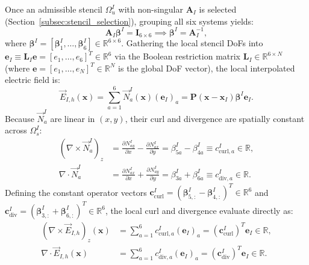 \documentclass[VANCOUVER,Times1COL]{WileyNJD-v5}
\begin{document}
Once an admissible stencil $\Omega_u^I$ with non-singular $\mathbf{A}_I$ is selected (Section~\ref{subsec:stencil_selection}), grouping all six systems yields:
\begin{equation}
    \mathbf{A}_I \boldsymbol{\beta}^I = \mathbf{I}_{6 \times 6} \implies \boldsymbol{\beta}^I = \mathbf{A}_I^{-1},
    \label{eq:beta_matrix_inversion}
\end{equation}
where $\boldsymbol{\beta}^I = [\boldsymbol{\beta}_1^I, \dots, \boldsymbol{\beta}_6^I] \in \mathbb{R}^{6 \times 6}$. Gathering the local stencil DoFs into $\mathbf{e}_I \equiv \mathbf{L}_I \mathbf{e} = [e_1, \dots, e_6]^T \in \mathbb{R}^6$ via the Boolean restriction matrix $\mathbf{L}_I \in \mathbb{R}^{6 \times N}$ (where $\mathbf{e} = [e_1, \dots, e_N]^T \in \mathbb{R}^N$ is the global DoF vector), the local interpolated electric field is:
\begin{equation}
    \vec{E}_{I,h}(\mathbf{x}) = \sum_{a=1}^6 \vec{N}_a^I(\mathbf{x}) (\mathbf{e}_I)_a = \mathbf{P}(\mathbf{x} - \mathbf{x}_I) \boldsymbol{\beta}^I \mathbf{e}_I.
    \label{eq:field_interpolation_mlpg}
\end{equation}
Because $\vec{N}_a^I$ are linear in $(x, y)$, their curl and divergence are spatially constant across $\Omega_s^I$:
\begin{align}
    (\nabla \times \vec{N}_a^I)_z & = \frac{\partial N_{ay}^I}{\partial x} - \frac{\partial N_{ax}^I}{\partial y} = \beta_{5a}^I - \beta_{4a}^I \equiv c_{\mathrm{curl}, a}^I \in \mathbb{R}, \label{eq:curl_constant} \\
    \nabla \cdot \vec{N}_a^I      & = \frac{\partial N_{ax}^I}{\partial x} + \frac{\partial N_{ay}^I}{\partial y} = \beta_{3a}^I + \beta_{6a}^I \equiv c_{\mathrm{div}, a}^I \in \mathbb{R}. \label{eq:div_constant}
\end{align}
Defining the constant operator vectors $\mathbf{c}_{\mathrm{curl}}^I = (\boldsymbol{\beta}_{5, :}^I - \boldsymbol{\beta}_{4, :}^I)^T \in \mathbb{R}^6$ and $\mathbf{c}_{\mathrm{div}}^I = (\boldsymbol{\beta}_{3, :}^I + \boldsymbol{\beta}_{6, :}^I)^T \in \mathbb{R}^6$, the local curl and divergence evaluate directly as:
\begin{align}
    (\nabla \times \vec{E}_{I,h})_z(\mathbf{x}) & = \sum_{a=1}^6 c_{\mathrm{curl}, a}^I (\mathbf{e}_I)_a = (\mathbf{c}_{\mathrm{curl}}^I)^T \mathbf{e}_I \in \mathbb{R}, \label{eq:field_curl_constant} \\
    \nabla \cdot \vec{E}_{I,h}(\mathbf{x})      & = \sum_{a=1}^6 c_{\mathrm{div}, a}^I (\mathbf{e}_I)_a = (\mathbf{c}_{\mathrm{div}}^I)^T \mathbf{e}_I \in \mathbb{R}. \label{eq:field_div_constant}
\end{align}
\end{document}
